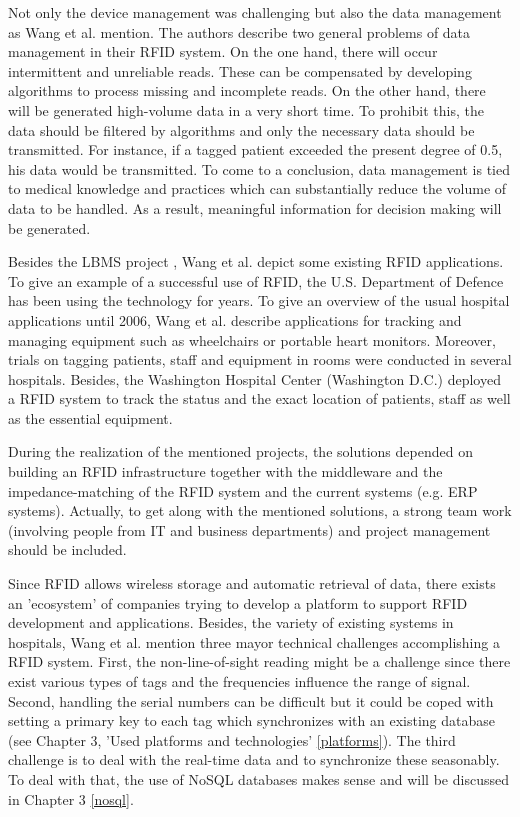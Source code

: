 Not only the device management was challenging but also the data management as Wang et al. mention. The authors describe two general problems of data management in their RFID system. On the one hand, there will occur intermittent and unreliable reads. These can be compensated by developing algorithms to process missing and incomplete reads. On the other hand, there will be generated high-volume data in a very short time. To prohibit this, the data should be filtered by algorithms and only the necessary data should be transmitted. For instance, if a tagged patient exceeded the present degree of 0.5\celsius, his data would be transmitted. To come to a conclusion, data management is tied to medical knowledge and practices which can substantially reduce the volume of data to be handled. As a result, meaningful information for decision making will be generated.
 
Besides the LBMS project \cite[p.2 ff.]{casestudy}, Wang et al. depict some existing RFID applications. To give an example of a successful use of RFID, the U.S. Department of Defence has been using the technology for years. 
To give an overview of the usual hospital applications until 2006, Wang et al. describe applications for tracking and managing equipment such as wheelchairs or portable heart monitors. Moreover, trials on tagging patients, staff and equipment in rooms were conducted in several hospitals. Besides, the Washington Hospital Center (Washington D.C.) deployed a RFID system to track the status and the exact location of patients, staff as well as the essential equipment.

During the realization of the mentioned projects, the solutions depended on building an RFID infrastructure together with the middleware and the impedance-matching of the RFID system and the current systems (e.g. \ac{ERP} systems). Actually, to get along with the mentioned solutions, a strong team work (involving people from IT and business departments) and project management should be included. 

Since RFID allows wireless storage and automatic retrieval of data, there exists an 'ecosystem' of companies trying to develop a platform to support RFID development and applications.  Besides, the variety of existing systems in hospitals, Wang et al. mention three mayor technical challenges accomplishing a RFID system. First, the non-line-of-sight reading might be a challenge since there exist various types of tags and the frequencies influence the range of signal. Second, handling the serial numbers can be difficult but it could be coped with setting a primary key to each tag which synchronizes with an existing database (see Chapter 3, 'Used platforms and technologies' \ref{platforms}).
The third challenge is to deal with the real-time data and to synchronize these seasonably. To deal with that, the use of NoSQL databases makes sense and will be discussed in Chapter 3 \ref{nosql}.

